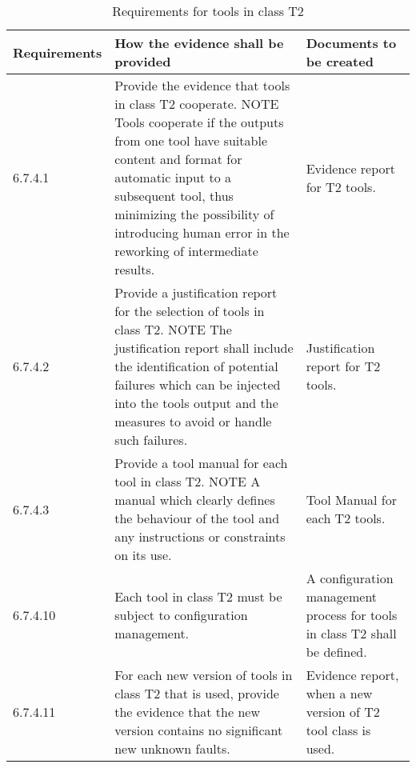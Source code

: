 \documentclass{template/openetcs_report}
\begin{document}
{\footnotesize\sffamily\centering
\begin{longtable}{|p{2cm}|p{9cm}|p{3cm}|}
\caption{Requirements for tools in class T2}\\
\hline
\bfseries Requirements & \bfseries How the evidence shall be provided & \bfseries Documents to be created\\
\hline
\hline
\endhead
\hline
\endfoot

6.7.4.1 & Provide the evidence that tools in class T2 cooperate.
\linebreak
\linebreak 
NOTE \linebreak
Tools cooperate if the outputs from one tool have suitable content and format for automatic input to a subsequent tool, thus minimizing the possibility of introducing human error in the reworking of intermediate results. & Evidence report for T2 tools.\\ 
\hline
6.7.4.2 & Provide a justification report for the selection of tools in class T2.
\linebreak
\linebreak 
NOTE \linebreak
The justification report shall include the identification of potential failures which can be injected into the tools output and the measures to avoid or handle such failures. & Justification report for T2 tools.\\ 
\hline
6.7.4.3 & Provide a tool manual for each tool in class T2.
\linebreak
\linebreak
NOTE \linebreak
A manual which clearly defines the behaviour of the tool and any instructions or constraints on its use. & Tool Manual for each T2 tools.\\ 
\hline
6.7.4.10 & Each tool in class T2 must be subject to configuration management. & A configuration management process for tools in class T2 shall be defined.\\ 
\hline
6.7.4.11 & For each new version of tools in class T2 that is used, provide the evidence that the new version contains no significant new unknown faults. & Evidence report, when a new version of T2 tool class is used.\\ 
\hline
\end{longtable}}
\end{document}
